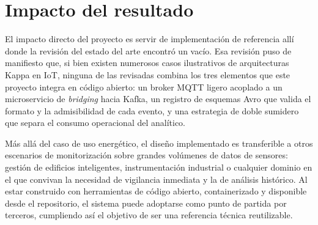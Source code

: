 \section{Impacto del resultado}

El impacto directo del proyecto es servir de implementación de referencia allí donde la revisión del estado del arte encontró un vacío. Esa revisión puso de manifiesto que, si bien existen numerosos casos ilustrativos de arquitecturas Kappa en IoT, ninguna de las revisadas combina los tres elementos que este proyecto integra en código abierto: un broker MQTT ligero acoplado a un microservicio de \textit{bridging} hacia Kafka, un registro de esquemas Avro que valida el formato y la admisibilidad de cada evento, y una estrategia de doble sumidero que separa el consumo operacional del analítico.

Más allá del caso de uso energético, el diseño implementado es transferible a otros escenarios de monitorización sobre grandes volúmenes de datos de sensores: gestión de edificios inteligentes, instrumentación industrial o cualquier dominio en el que convivan la necesidad de vigilancia inmediata y la de análisis histórico. Al estar construido con herramientas de código abierto, containerizado y disponible desde el repositorio, el sistema puede adoptarse como punto de partida por terceros, cumpliendo así el objetivo de ser una referencia técnica reutilizable.